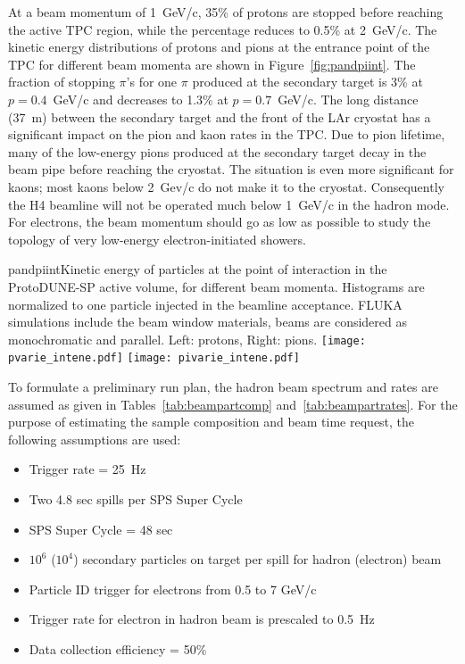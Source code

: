 At a beam momentum of 1~GeV/c, 35\% of protons are stopped before reaching the active TPC region, while the percentage reduces to 0.5\% at 2~GeV/c.  The kinetic energy distributions of protons and pions at the entrance point of the TPC for different beam momenta are shown in Figure~\ref{fig:pandpiint}. 
The fraction of stopping $\pi$'s for one $\pi$
produced at the secondary target is 3\% at $p=0.4$~GeV/c and decreases to 1.3\% at $p=0.7$~GeV/c.
The long distance (37~m) between the secondary target and the front of the LAr cryostat has a significant impact on the pion and kaon rates in the TPC. Due to pion lifetime, many of the  low-energy pions produced at the secondary target decay in the beam pipe before reaching the cryostat. The situation is even more significant for kaons; most kaons below 2~Gev/c do not make it to the cryostat.
Consequently the H4 beamline will not be operated much below 1~GeV/c in the hadron mode.
For electrons, %
the beam momentum should go %
as low as possible to study the topology of very low-energy electron-initiated 
showers.
\begin{cdrfigure}{pandpiint}{Kinetic energy of
    particles at the point of interaction in the ProtoDUNE-SP active
    volume, for different beam momenta. Histograms are normalized to one particle injected in the
    beamline acceptance. FLUKA simulations include the beam window
    materials, beams are considered as monochromatic and
    parallel. Left: protons, Right: pions.}
  \texttt{[image: pvarie\_intene.pdf]}
  \texttt{[image: pivarie\_intene.pdf]}
\end{cdrfigure}


To formulate a preliminary run plan, %
the hadron beam spectrum and rates are assumed as given in Tables~\ref{tab:beampartcomp} and~\ref{tab:beampartrates}.   For the purpose of estimating the sample composition and beam time request, the following assumptions are used:
\begin{itemize}
\item { Trigger rate = 25~Hz}
\item { Two 4.8 sec spills per SPS Super Cycle }
\item { SPS Super Cycle = 48 sec}
\item { $10^6$ ($10^4$) secondary particles on target per spill for hadron (electron) beam}
\item { Particle ID trigger for electrons from 0.5 to 7 GeV/c}
\item { Trigger rate for electron in hadron beam is prescaled to 0.5~Hz}
\item { Data collection efficiency = 50\%}
\end{itemize}

